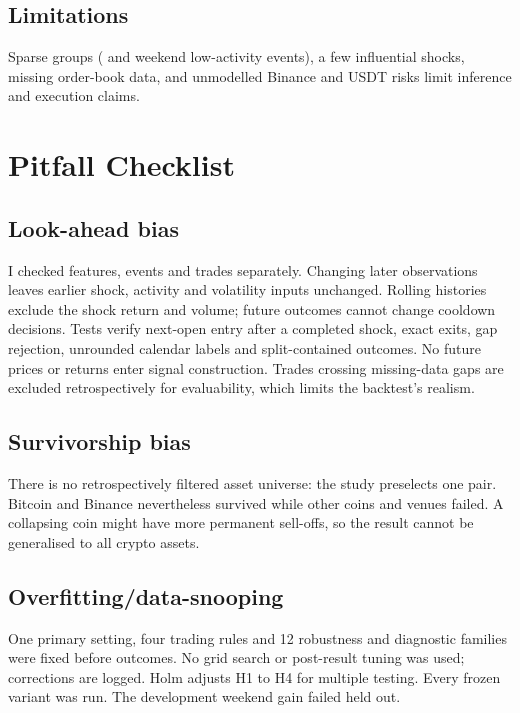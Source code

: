 \documentclass[11pt,a4paper]{article}
\begin{document}
\subsection{Limitations}

Sparse groups (\DevCombinedEvents{} and \HoCombinedEvents{} weekend low-activity events), a few influential shocks, missing order-book data, and unmodelled Binance and USDT risks limit inference and execution claims.

\section{Pitfall Checklist}

\subsection{Look-ahead bias}

I checked features, events and trades separately. Changing later observations leaves earlier shock, activity and volatility inputs unchanged. Rolling histories exclude the shock return and volume; future outcomes cannot change cooldown decisions. Tests verify next-open entry after a completed shock, exact exits, gap rejection, unrounded calendar labels and split-contained outcomes. No future prices or returns enter signal construction. Trades crossing missing-data gaps are excluded retrospectively for evaluability, which limits the backtest's realism.

\subsection{Survivorship bias}

There is no retrospectively filtered asset universe: the study preselects one pair. Bitcoin and Binance nevertheless survived while other coins and venues failed. A collapsing coin might have more permanent sell-offs, so the result cannot be generalised to all crypto assets.

\subsection{Overfitting/data-snooping}

One primary setting, four trading rules and 12 robustness and diagnostic families were fixed before outcomes. No grid search or post-result tuning was used; corrections are logged. Holm adjusts H1 to H4 for multiple testing. Every frozen variant was run. The \DevWeekendNet{} development weekend gain failed held out.
\end{document}
